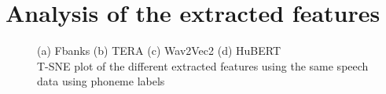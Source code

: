 \section{Analysis of the extracted features}
\begin{figure}
  \begin{center}
  \centering
  \caption{(a) Fbanks (b) TERA (c) Wav2Vec2 (d) HuBERT \\ T-SNE plot of the different extracted features using the same speech data using phoneme labels}
  \label{fig:tsne_ssl}  
\end{center}
\end{figure}
